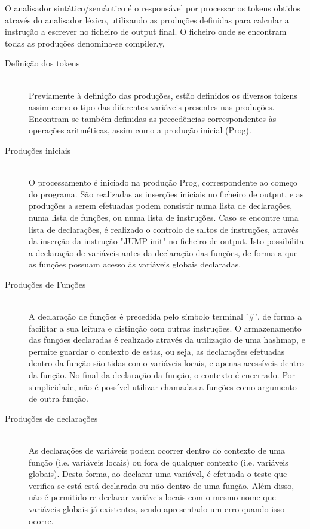 \documentclass[a4paper,10pt]{report}
\begin{document}
O analisador sintático/semântico é o responsável por processar os tokens obtidos através do analisador léxico, 
utilizando as produções definidas para calcular a instrução a escrever no ficheiro de output final. O ficheiro onde se encontram todas as 
produções denomina-se compiler.y, 

\begin{description}

\item[Definição dos tokens] \hfill \\

Previamente à definição das produções, estão definidos os diversos tokens assim como o tipo das diferentes variáveis presentes nas produções. Encontram-se também definidas as precedências correspondentes às operações aritméticas, assim como a produção inicial (Prog).  

\item[Produções iniciais] \hfill \\

O processamento é iniciado na produção Prog, correspondente ao começo do programa. São realizadas as inserções iniciais no ficheiro de output, e as produções a serem efetuadas podem consistir numa lista de declarações, numa lista de funções, ou numa lista de instruções. Caso se encontre uma lista de declarações, é realizado o controlo de saltos de instruções, através da inserção da instrução "JUMP init" no ficheiro de output. Isto possibilita a declaração de variáveis antes da declaração das funções, de forma a que as funções possuam acesso às variáveis globais declaradas.  

\item[Produções de Funções] \hfill \\

A declaração de funções é precedida pelo símbolo terminal '#', de forma a facilitar a sua leitura e distinção com outras instruções. O armazenamento das funções declaradas é realizado através da utilização de uma hashmap, e permite guardar o contexto de estas, ou seja, as declarações efetuadas dentro da função são tidas como variáveis locais, e apenas acessíveis dentro da função. No final da declaração da função, o contexto é encerrado. Por simplicidade, não é possível utilizar chamadas a funções como argumento de outra função.

\item[Produções de declarações] \hfill \\

As declarações de variáveis podem ocorrer dentro do contexto de uma função (i.e. variáveis locais) ou fora de qualquer contexto (i.e. variáveis globais). Desta forma, ao declarar uma variável, é efetuada o teste que verifica se está está declarada ou não dentro de uma função. Além disso, não é permitido re-declarar variáveis locais com o mesmo nome que variáveis globais já existentes, sendo apresentado um erro quando isso ocorre.


\end{description}
\end{document}
